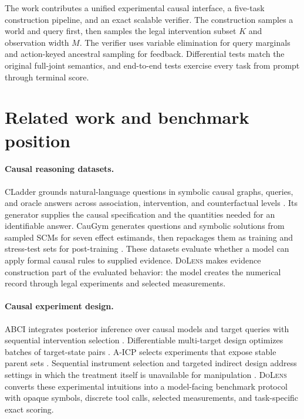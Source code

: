 \documentclass{article}
\newcommand{\method}{\textsc{DoLens}}
\begin{document}
The work contributes a unified experimental causal interface, a five-task
construction pipeline, and an exact scalable verifier. The construction samples a
world and query first, then samples the legal intervention subset $K$ and
observation width $M$. The verifier uses variable elimination for query marginals
and action-keyed ancestral
sampling for feedback. Differential tests match the original full-joint semantics,
and end-to-end tests exercise every task from prompt through terminal score.

\section{Related work and benchmark position}

\paragraph{Causal reasoning datasets.}
CLadder grounds natural-language questions in symbolic causal graphs, queries,
and oracle answers across association, intervention, and counterfactual levels
\citep{jin2023cladder}. Its generator supplies the causal specification and the
quantities needed for an identifiable answer. CauGym generates questions and
symbolic solutions from sampled SCMs for seven effect estimands, then repackages
them as training and stress-test sets for post-training
\citep{chen2026caugym}. These datasets evaluate whether a model can apply formal
causal rules to supplied evidence. \method{} makes evidence construction part of
the evaluated behavior: the model creates the numerical record through legal
experiments and selected measurements.

\paragraph{Causal experiment design.}
ABCI integrates posterior inference over causal models and target queries with
sequential intervention selection \citep{toth2022active}. Differentiable
multi-target design optimizes batches of target-state pairs
\citep{tigas2023differentiable}. A-ICP selects experiments that expose stable
parent sets \citep{gamella2020active}. Sequential instrument selection and
targeted indirect design address settings in which the treatment itself is
unavailable for manipulation \citep{ailer2023sequential,dern2024targeted}.
\method{} converts these experimental intuitions into a model-facing benchmark
protocol with opaque symbols, discrete tool calls, selected measurements, and
task-specific exact scoring.
\end{document}
